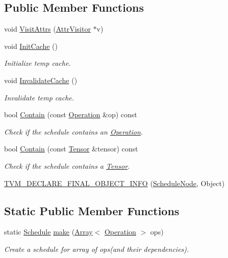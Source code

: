 \subsection*{Public Member Functions}
\begin{DoxyCompactItemize}
\item 
void \hyperlink{classtvm_1_1te_1_1ScheduleNode_a77fbc73cef9265d8ae817903564a6e44}{Visit\+Attrs} (\hyperlink{classtvm_1_1AttrVisitor}{Attr\+Visitor} $\ast$v)
\item 
void \hyperlink{classtvm_1_1te_1_1ScheduleNode_a2c2472f9cbb1d42bec661149fe801179}{Init\+Cache} ()
\begin{DoxyCompactList}\small\item\em Initialize temp cache. \end{DoxyCompactList}\item 
void \hyperlink{classtvm_1_1te_1_1ScheduleNode_a2b6a92ec4b1c295604b55ff8e8c365e7}{Invalidate\+Cache} ()
\begin{DoxyCompactList}\small\item\em Invalidate temp cache. \end{DoxyCompactList}\item 
bool \hyperlink{classtvm_1_1te_1_1ScheduleNode_a54bbdb82a87a597007f82751ffdf11c2}{Contain} (const \hyperlink{classtvm_1_1te_1_1Operation}{Operation} \&op) const 
\begin{DoxyCompactList}\small\item\em Check if the schedule contains an \hyperlink{classtvm_1_1te_1_1Operation}{Operation}. \end{DoxyCompactList}\item 
bool \hyperlink{classtvm_1_1te_1_1ScheduleNode_a2b30ce9ba2e0d6a174825bbfa8fc7e4d}{Contain} (const \hyperlink{classtvm_1_1te_1_1Tensor}{Tensor} \&tensor) const 
\begin{DoxyCompactList}\small\item\em Check if the schedule contains a \hyperlink{classtvm_1_1te_1_1Tensor}{Tensor}. \end{DoxyCompactList}\item 
\hyperlink{classtvm_1_1te_1_1ScheduleNode_a6ded7c6c5dfc7b8525c8048fdd9475ad}{T\+V\+M\+\_\+\+D\+E\+C\+L\+A\+R\+E\+\_\+\+F\+I\+N\+A\+L\+\_\+\+O\+B\+J\+E\+C\+T\+\_\+\+I\+N\+FO} (\hyperlink{classtvm_1_1te_1_1ScheduleNode}{Schedule\+Node}, Object)
\end{DoxyCompactItemize}
\subsection*{Static Public Member Functions}
\begin{DoxyCompactItemize}
\item 
static \hyperlink{classtvm_1_1te_1_1Schedule}{Schedule} \hyperlink{classtvm_1_1te_1_1ScheduleNode_a5cc8e941bb4b977e6bd909c501025688}{make} (\hyperlink{classtvm_1_1Array}{Array}$<$ \hyperlink{classtvm_1_1te_1_1Operation}{Operation} $>$ ops)
\begin{DoxyCompactList}\small\item\em Create a schedule for array of ops(and their dependencies). \end{DoxyCompactList}\end{DoxyCompactItemize}
